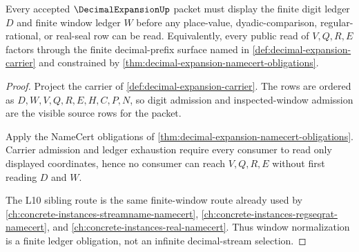 \begin{theorem}\label{thm:decimal-expansion-window-normalization-obligation}
Every accepted $\DecimalExpansionUp$ packet must display the finite digit ledger $D$ and finite window ledger $W$ before any place-value, dyadic-comparison, regular-rational, or real-seal row can be read. Equivalently, every public read of $V,Q,R,E$ factors through the finite decimal-prefix surface named in \autoref{def:decimal-expansion-carrier} and constrained by \autoref{thm:decimal-expansion-namecert-obligations}.
\end{theorem}
\begin{proof}
Project the carrier of \autoref{def:decimal-expansion-carrier}. The rows are ordered as $D,W,V,Q,R,E,H,C,P,N$, so digit admission and inspected-window admission are the visible source rows for the packet.

Apply the NameCert obligations of \autoref{thm:decimal-expansion-namecert-obligations}. Carrier admission and ledger exhaustion require every consumer to read only displayed coordinates, hence no consumer can reach $V,Q,R,E$ without first reading $D$ and $W$.

The L10 sibling route is the same finite-window route already used by \autoref{ch:concrete-instances-streamname-namecert}, \autoref{ch:concrete-instances-regseqrat-namecert}, and \autoref{ch:concrete-instances-real-namecert}. Thus window normalization is a finite ledger obligation, not an infinite decimal-stream selection.
\end{proof}


